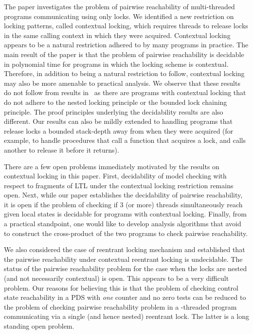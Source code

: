 \documentclass{LMCS}
\begin{document}
The paper investigates the problem of pairwise reachability of
multi-threaded programs communicating using only locks. We identified
a new restriction on locking patterns, called contextual locking,
which requires threads to release locks in the same calling context in
which they were acquired. Contextual locking appears to be a natural
restriction adhered to by many programs in practice. The main result
of the paper is that the problem of pairwise reachability is decidable
in polynomial time for programs in which the locking scheme is
contextual. Therefore, in addition to being a natural restriction to
follow, contextual locking may also be more amenable to 
practical analysis.  We observe that these results do not follow from
results in~\cite{kig05,kg06,kah09,kah11} as there are programs
with contextual locking that do not adhere to the nested locking
principle or the bounded lock chaining principle. The proof principles
underlying the decidability results are also different. Our results can also be mildly extended to handling programs that release locks a bounded stack-depth away from when they were acquired
   (for example, to handle procedures that call a function that acquires a lock, and calls another to release it before it returns).



There are a few open problems immediately motivated by the results on contextual locking in
this paper. First, decidability of model checking with respect to
fragments of LTL under the contextual locking restriction remains
open. Next, while our paper establishes the decidability of pairwise
reachability, it is open if the problem of checking if 3 (or more) threads
simultaneously reach given local states is decidable for programs with
contextual locking. Finally, from a practical standpoint, one would
like to develop analysis algorithms that avoid to construct the
cross-product of the two programs to check pairwise reachability.


We also considered the case of reentrant locking mechanism and established that the pairwise reachability under
contextual reentrant locking is undecidable. The status of the pairwise reachability problem for the case when the
locks are nested (and not necessarily contextual) is open. This appears to be a very difficult problem. Our reasons for
believing this is that the problem of checking control state reachability in a PDS with \emph{one} counter and no zero tests
can be reduced to the problem of checking pairwise reachability problem  in a -threaded program communicating via a single (and hence nested) reentrant lock.   
The latter is a long standing open problem.  
\end{document}
